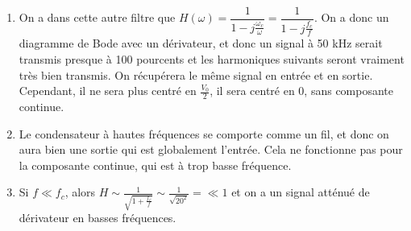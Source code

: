 \documentclass[a4paper,12pt]{book}
\begin{document}
\begin{enumerate}
\item On a dans cette autre filtre que $H(\omega)=\dfrac{1}{1-j\frac{\omega_c}{\omega}} = \dfrac{1}{1-j\frac{f_c}{f}}$. On a donc un diagramme de Bode avec un dérivateur, et donc un signal à 50 kHz serait transmis presque à 100 pourcents et les harmoniques suivants seront vraiment très bien transmis. On récupérera le même signal en entrée et en sortie. Cependant, il ne sera plus centré en $\frac{V_0}{2}$, il sera centré en 0, sans composante continue.
\item Le condensateur à hautes fréquences se comporte comme un fil, et donc on aura bien une sortie qui est globalement l'entrée. Cela ne fonctionne pas pour la composante continue, qui est à trop basse fréquence.
\item Si $f\ll f_c$, alors $H\sim\frac{1}{\sqrt{1+\frac{f_c}{f}}} \sim\frac{1}{\sqrt{20^2}}= \ll 1$ et on a un signal atténué de dérivateur en basses fréquences.
\end{enumerate}
\end{document}
